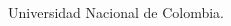 \documentclass[10pt]{article}
\begin{document}
\tableofcontents 

\newpage












% 





\begin{thebibliography}{References}

 Universidad Nacional de Colombia.
\end{thebibliography}  








\end{document}
